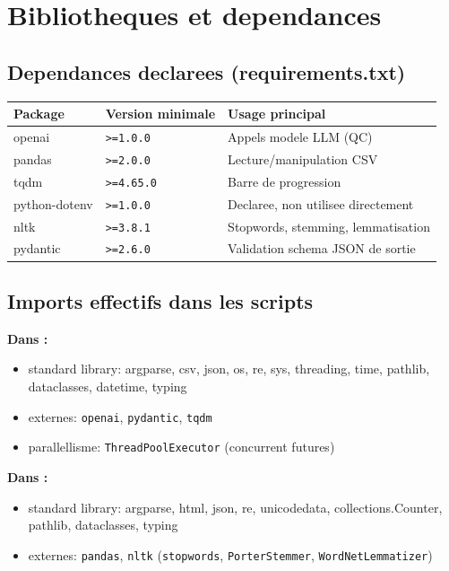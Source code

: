 \documentclass[11pt,a4paper]{article}
\begin{document}
\section{Bibliotheques et dependances}
\subsection{Dependances declarees (requirements.txt)}
\begin{center}
\begin{tabular}{lll}
\toprule
Package & Version minimale & Usage principal \\
\midrule
openai & \texttt{>=1.0.0} & Appels modele LLM (QC) \\
pandas & \texttt{>=2.0.0} & Lecture/manipulation CSV \\
tqdm & \texttt{>=4.65.0} & Barre de progression \\
python-dotenv & \texttt{>=1.0.0} & Declaree, non utilisee directement \\
nltk & \texttt{>=3.8.1} & Stopwords, stemming, lemmatisation \\
pydantic & \texttt{>=2.6.0} & Validation schema JSON de sortie \\
\bottomrule
\end{tabular}
\end{center}

\subsection{Imports effectifs dans les scripts}
\textbf{Dans :}
\begin{itemize}[leftmargin=*]
  \item standard library: argparse, csv, json, os, re, sys, threading, time,
  pathlib, dataclasses, datetime, typing
  \item externes: \texttt{openai}, \texttt{pydantic}, \texttt{tqdm}
  \item parallellisme: \texttt{ThreadPoolExecutor} (concurrent futures)
\end{itemize}

\textbf{Dans :}
\begin{itemize}[leftmargin=*]
  \item standard library: argparse, html, json, re, unicodedata,
  collections.Counter, pathlib, dataclasses, typing
  \item externes: \texttt{pandas}, \texttt{nltk} (\texttt{stopwords}, \texttt{PorterStemmer}, \texttt{WordNetLemmatizer})
\end{itemize}
\end{document}
